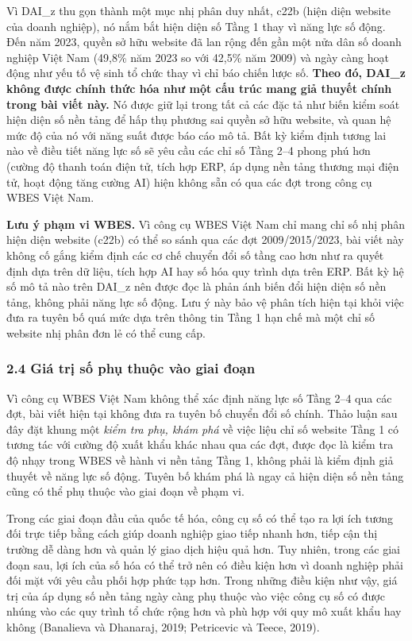\documentclass[12pt,a4paper]{article}
\begin{document}
Vì DAI\_z thu gọn thành một mục nhị phân duy nhất, c22b (hiện diện
website của doanh nghiệp), nó nắm bắt hiện diện số Tầng 1 thay vì năng
lực số động. Đến năm 2023, quyền sở hữu website đã lan rộng đến gần một
nửa dân số doanh nghiệp Việt Nam (49,8\% năm 2023 so với 42,5\% năm
2009) và ngày càng hoạt động như yếu tố vệ sinh tổ chức thay vì chỉ báo
chiến lược số. \textbf{Theo đó, DAI\_z không được chính thức hóa như một
cấu trúc mang giả thuyết chính trong bài viết này.} Nó được giữ lại
trong tất cả các đặc tả như biến kiểm soát hiện diện số nền tảng để hấp
thụ phương sai quyền sở hữu website, và quan hệ mức độ của nó với năng
suất được báo cáo mô tả. Bất kỳ kiểm định tương lai nào về điều tiết
năng lực số sẽ yêu cầu các chỉ số Tầng 2--4 phong phú hơn (cường độ
thanh toán điện tử, tích hợp ERP, áp dụng nền tảng thương mại điện tử,
hoạt động tăng cường AI) hiện không sẵn có qua các đợt trong công cụ
WBES Việt Nam.

\textbf{Lưu ý phạm vi WBES.} Vì công cụ WBES Việt Nam chỉ mang chỉ số
nhị phân hiện diện website (c22b) có thể so sánh qua các đợt
2009/2015/2023, bài viết này không cố gắng kiểm định các cơ chế chuyển
đổi số tầng cao hơn như ra quyết định dựa trên dữ liệu, tích hợp AI hay
số hóa quy trình dựa trên ERP. Bất kỳ hệ số mô tả nào trên DAI\_z nên
được đọc là phản ánh biến đổi hiện diện số nền tảng, không phải năng lực
số động. Lưu ý này bảo vệ phân tích hiện tại khỏi việc đưa ra tuyên bố
quá mức dựa trên thông tin Tầng 1 hạn chế mà một chỉ số website nhị phân
đơn lẻ có thể cung cấp.

\hypertarget{24-giuxe1-trux1ecb-sux1ed1-phux1ee5-thuux1ed9c-vuxe0o-giai-ux111oux1ea1n}{%
\subsubsection{2.4 Giá trị số phụ thuộc vào giai
đoạn}\label{24-giuxe1-trux1ecb-sux1ed1-phux1ee5-thuux1ed9c-vuxe0o-giai-ux111oux1ea1n}}

Vì công cụ WBES Việt Nam không thể xác định năng lực số Tầng 2--4 qua
các đợt, bài viết hiện tại không đưa ra tuyên bố chuyển đổi số chính.
Thảo luận sau đây đặt khung một \emph{kiểm tra phụ, khám phá} về việc
liệu chỉ số website Tầng 1 có tương tác với cường độ xuất khẩu khác nhau
qua các đợt, được đọc là kiểm tra độ nhạy trong WBES về hành vi nền tảng
Tầng 1, không phải là kiểm định giả thuyết về năng lực số động. Tuyên bố
khám phá là ngay cả hiện diện số nền tảng cũng có thể phụ thuộc vào giai
đoạn về phạm vi.

Trong các giai đoạn đầu của quốc tế hóa, công cụ số có thể tạo ra lợi
ích tương đối trực tiếp bằng cách giúp doanh nghiệp giao tiếp nhanh hơn,
tiếp cận thị trường dễ dàng hơn và quản lý giao dịch hiệu quả hơn. Tuy
nhiên, trong các giai đoạn sau, lợi ích của số hóa có thể trở nên có
điều kiện hơn vì doanh nghiệp phải đối mặt với yêu cầu phối hợp phức tạp
hơn. Trong những điều kiện như vậy, giá trị của áp dụng số nền tảng ngày
càng phụ thuộc vào việc công cụ số có được nhúng vào các quy trình tổ
chức rộng hơn và phù hợp với quy mô xuất khẩu hay không (Banalieva và
Dhanaraj, 2019; Petricevic và Teece, 2019).
\end{document}

